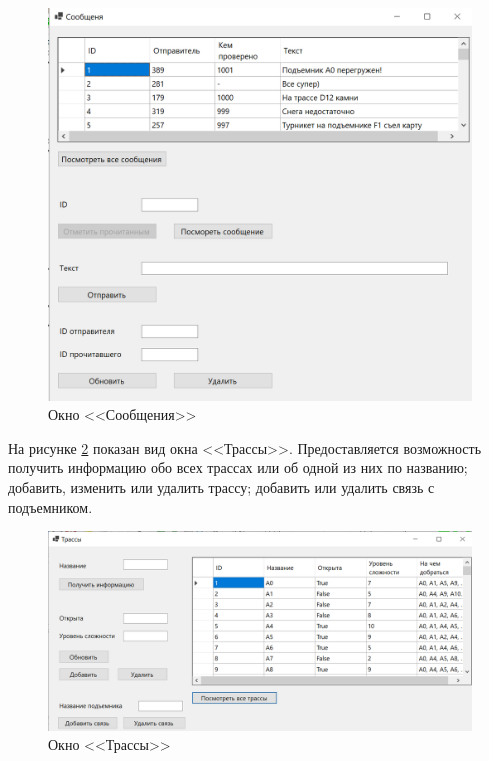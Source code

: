 \begin{figure}[h!]
	\begin{center}
		\includegraphics[scale=0.65]{../imgs/int/messages.png}
	\end{center}
	\captionsetup{justification=centering}
	\caption{Окно <<Сообщения>>}
	\label{img:messages}
\end{figure}


На рисунке \ref{img:slopes} показан вид окна <<Трассы>>. Предоставляется возможность получить информацию обо всех трассах или об одной из них по названию; добавить, изменить или удалить трассу; добавить или удалить связь с подъемником.


\begin{figure}[h!]
	\begin{center}
		\includegraphics[scale=0.7]{../imgs/int/slopes.png}
	\end{center}
	\captionsetup{justification=centering}
	\caption{Окно <<Трассы>>}
	\label{img:slopes}
\end{figure}

